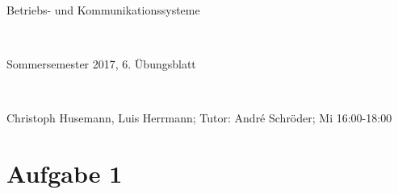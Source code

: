 \documentclass[numbers=noendperiod]{scrartcl}
\begin{document}
	
	\newcommand{\inputmintedframed}[2]{
		\begin{mdframed}[linecolor=bg,backgroundcolor=bg]
			\inputminted[mathescape,breaklines,linenos,numbersep=5pt,tabsize=3]{#1}{#2}
	\end{mdframed}}
	
	\hrulefill
	\begin{center}
		\bfseries %
		\sffamily %
		\begin{huge}
			Betriebs- und Kommunikationssysteme
		\end{huge}\\
		\begin{Large}
			Sommersemester 2017, 6. Übungsblatt
		\end{Large}\\
		\begin{small}
			Christoph Husemann, Luis Herrmann; Tutor: André Schröder; Mi 16:00-18:00
		\end{small}
		
		\vspace{-10pt}
	\end{center}
	\hrulefill
	
\section*{Aufgabe 1}
\end{document}
